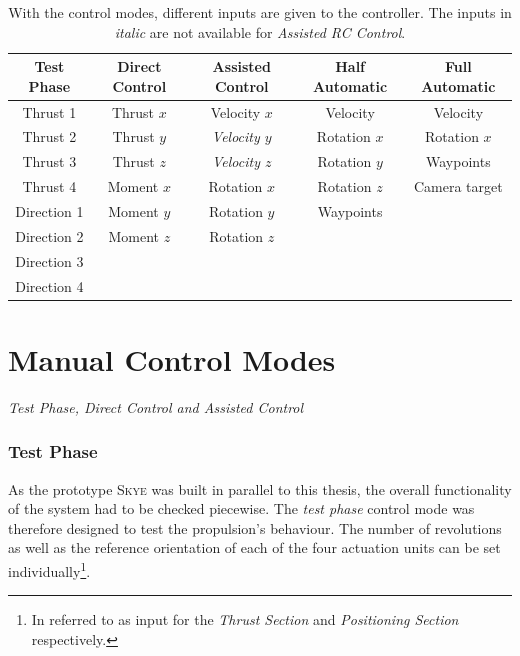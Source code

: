 \begin{table}[h]		%
	\begin{tabular}{c c c c c} %
	Test Phase 		& Direct Control 	& Assisted Control 	& Half Automatic	& Full Automatic  \\
	\toprule[1.25pt]				%
	Thrust 1		& Thrust $x$	& Velocity $x$	& Velocity	& Velocity	\\
	Thrust 2		& Thrust $y$	& \textit{Velocity $y$}	& Rotation $x$	& Rotation $x$\\
	Thrust 3		& Thrust $z$	& \textit{Velocity $z$}	& Rotation $y$	& Waypoints	\\
	Thrust 4		& Moment $x$	& Rotation $x$	& Rotation $z$	&	Camera target\\
	Direction 1		& Moment $y$	& Rotation $y$	& Waypoints	&	\\
	Direction 2		& Moment $z$	& Rotation $z$	&		&	\\
	Direction 3		& 		& 		&		&	\\
	Direction 4		& 		& 		&		&	\\

	\bottomrule[1.25pt]
	\end{tabular} 
	\caption[The different control modes]{With the control modes, different inputs are given to the controller. The inputs in \textit{italic} are not available for \textit{Assisted RC  Control}.}
	\label{tab:control_modes}
\end{table}

\section{Manual Control Modes}
\label{sec:manualControlModes}
\textit{Test Phase, Direct Control and Assisted Control}
\subsubsection{Test Phase} 
As the prototype \textsc{Skye} was built in parallel to this thesis, the overall functionality of the system had to be checked piecewise. The \textit{test phase} control mode was therefore designed to test the propulsion's behaviour. The number of revolutions as well as the reference orientation of each of the four actuation units can be set individually\footnote{In \cite{schaffnervu} referred to as input for the \textit{Thrust Section} and \textit{Positioning Section} respectively.}.

